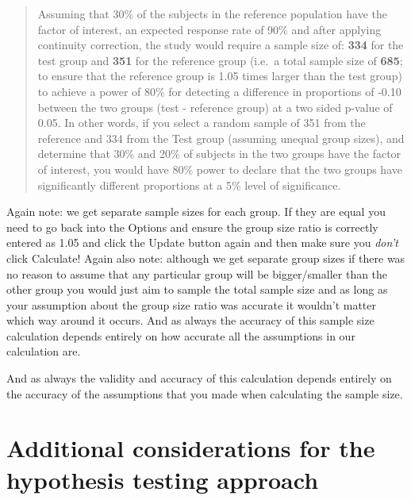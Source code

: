 \documentclass[
]{book}
\begin{document}
\begin{quote}
Assuming that 30\% of the subjects in the reference population have the factor of interest, an expected response rate of 90\% and after applying continuity correction, the study would require a sample size of: \textbf{334} for the test group and \textbf{351} for the reference group (i.e.~a total sample size of \textbf{685}; to ensure that the reference group is 1.05 times larger than the test group) to achieve a power of 80\% for detecting a difference in proportions of -0.10 between the two groups (test - reference group) at a two sided p-value of 0.05. In other words, if you select a random sample of 351 from the reference and 334 from the Test group (assuming unequal group sizes), and determine that 30\% and 20\% of subjects in the two groups have the factor of interest, you would have 80\% power to declare that the two groups have significantly different proportions at a 5\% level of significance.
\end{quote}

Again note: we get separate sample sizes for each group. If they are equal you need to go back into the Options and ensure the group size ratio is correctly entered as 1.05 and click the Update button again and then make sure you \emph{don't} click Calculate! Again also note: although we get separate group sizes if there was no reason to assume that any particular group will be bigger/smaller than the other group you would just aim to sample the total sample size and as long as your assumption about the group size ratio was accurate it wouldn't matter which way around it occurs. And as always the accuracy of this sample size calculation depends entirely on how accurate all the assumptions in our calculation are.

And as always the validity and accuracy of this calculation depends entirely on the accuracy of the assumptions that you made when calculating the sample size.

\hypertarget{additional-considerations-for-the-hypothesis-testing-approach}{%
\section{Additional considerations for the hypothesis testing approach}\label{additional-considerations-for-the-hypothesis-testing-approach}}
\end{document}
